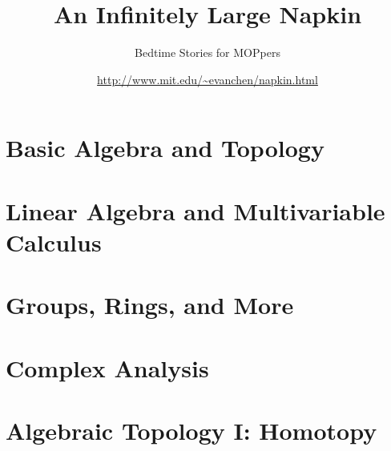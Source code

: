 \documentclass[11pt,numbers=noenddot]{scrreprt}
\begin{document}
\title{An Infinitely Large Napkin}
\subtitle{Bedtime Stories for MOPpers}
\date{\url{http://www.mit.edu/~evanchen/napkin.html}}
\maketitle



\tableofcontents




\part{Basic Algebra and Topology}






\part{Linear Algebra and Multivariable Calculus}


\part{Groups, Rings, and More}





\part{Complex Analysis}



%



\part{Algebraic Topology I: Homotopy}

\end{document}
